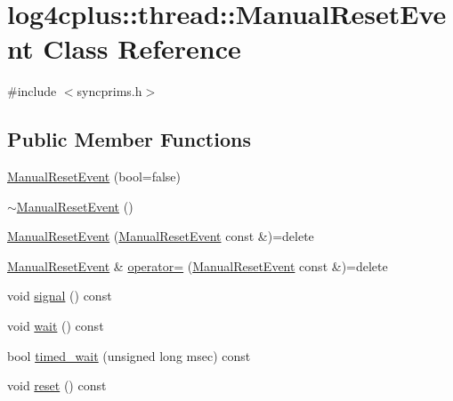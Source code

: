 \hypertarget{classlog4cplus_1_1thread_1_1ManualResetEvent}{\section{log4cplus\-:\-:thread\-:\-:Manual\-Reset\-Event Class Reference}
\label{classlog4cplus_1_1thread_1_1ManualResetEvent}
}


{\ttfamily \#include $<$syncprims.\-h$>$}

\subsection*{Public Member Functions}
\begin{DoxyCompactItemize}
\item 
\hyperlink{classlog4cplus_1_1thread_1_1ManualResetEvent_ac68d12eaff61ee5fc69669e8ccbd5626}{Manual\-Reset\-Event} (bool=false)
\item 
\hyperlink{classlog4cplus_1_1thread_1_1ManualResetEvent_a0c8f5b6cc97c17e88b162baf2277c0cd}{$\sim$\-Manual\-Reset\-Event} ()
\item 
\hyperlink{classlog4cplus_1_1thread_1_1ManualResetEvent_a529c8f891fcae28214437da3823e1192}{Manual\-Reset\-Event} (\hyperlink{classlog4cplus_1_1thread_1_1ManualResetEvent}{Manual\-Reset\-Event} const \&)=delete
\item 
\hyperlink{classlog4cplus_1_1thread_1_1ManualResetEvent}{Manual\-Reset\-Event} \& \hyperlink{classlog4cplus_1_1thread_1_1ManualResetEvent_a19fee0abd53bb4469ee823e91e189311}{operator=} (\hyperlink{classlog4cplus_1_1thread_1_1ManualResetEvent}{Manual\-Reset\-Event} const \&)=delete
\item 
void \hyperlink{classlog4cplus_1_1thread_1_1ManualResetEvent_a738c71a37b0f70932062657235823fac}{signal} () const 
\item 
void \hyperlink{classlog4cplus_1_1thread_1_1ManualResetEvent_a9e11a7bda9793bb272607313b9435293}{wait} () const 
\item 
bool \hyperlink{classlog4cplus_1_1thread_1_1ManualResetEvent_aa5a64f937b6e5f1641721a4968c610d9}{timed\-\_\-wait} (unsigned long msec) const 
\item 
void \hyperlink{classlog4cplus_1_1thread_1_1ManualResetEvent_a64527ff1fa1cdfb9fd80e93be8771805}{reset} () const 
\end{DoxyCompactItemize}


